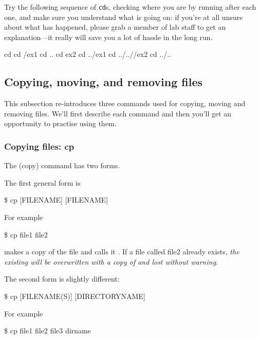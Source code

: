 Try the following sequence of \texttt{cd}s, checking where you are by running  after each one, and make sure you understand what is going on: if you're at all unsure about what has happened, please grab a member of lab staff to get an explanation---it really will save you a lot of hassle in the long run. 

\begin{ttoutenv}
  cd \return 
  cd \crsname/ex1 \return 
  cd .. \return 
  cd ex2 \return 
  cd ../ex1 \return 
  cd ../../\crsname/ex2 \return 
  cd ../.. \return
\end{ttoutenv}
%

\subsection{Copying, moving, and removing files}

This subsection re-introduces three commands used for copying, moving and
removing files. We'll first describe each command and then you'll get an opportunity  to practise using them.

\subsubsection{Copying files: cp}

\noindent The  (copy) command has two forms.


The first general form is
\begin{ttoutenv}
\$  cp [FILENAME] [FILENAME] \return
\end{ttoutenv}

For example

\begin{ttoutenv}
\$  cp file1 file2 \return
\end{ttoutenv}
%
makes a copy of the file  and calls it .  If
a file called file2 already exists, \emph{the existing  will be  overwritten
with a copy of  and lost without warning}.

The second form is slightly different:
\begin{ttoutenv}
\$  cp [FILENAME(S)] [DIRECTORYNAME]
\end{ttoutenv}
%
For example

\begin{ttoutenv}
\$  cp file1 file2 file3 dirname \return
\end{ttoutenv}

